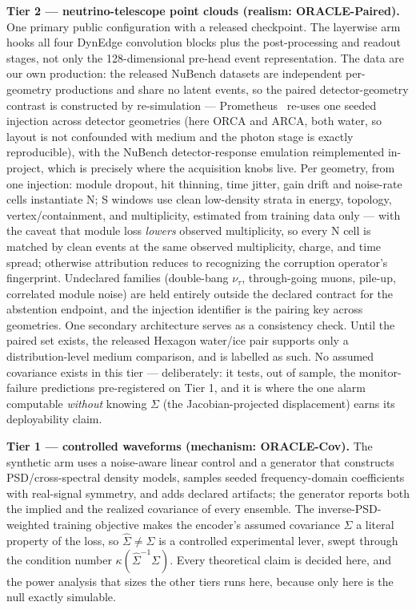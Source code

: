 \documentclass[10pt,twocolumn]{extarticle}
\begin{document}
\textbf{Tier 2 --- neutrino-telescope point clouds (realism:
ORACLE-Paired).} One primary public configuration with a released checkpoint.
The layerwise arm hooks all four DynEdge convolution blocks plus the
post-processing and readout stages, not only the 128-dimensional pre-head
event representation. The data are our own production: the released NuBench
datasets are independent per-geometry productions and share no latent events,
so the paired detector-geometry contrast is constructed by re-simulation ---
Prometheus~\cite{prometheus} re-uses one seeded injection across detector
geometries (here ORCA and ARCA, both water, so layout is not confounded with
medium and the photon stage is exactly reproducible), with the NuBench
detector-response emulation reimplemented in-project, which is precisely where
the acquisition knobs live. Per geometry, from one injection: module dropout,
hit thinning, time jitter, gain drift and noise-rate cells instantiate N; S
windows use clean low-density strata in energy, topology, vertex/containment,
and multiplicity, estimated from training data only --- with the caveat that
module loss \emph{lowers} observed multiplicity, so every N cell is matched
by clean events at the same observed multiplicity, charge, and time spread;
otherwise attribution reduces to recognizing the corruption operator's
fingerprint. Undeclared families (double-bang $\nu_\tau$, through-going
muons, pile-up, correlated module noise) are held entirely outside the
declared contract for the abstention endpoint, and the injection identifier is
the pairing key across geometries. One secondary architecture serves as a
consistency check. Until the paired set exists, the released Hexagon water/ice
pair supports only a distribution-level medium comparison, and is labelled as
such. No assumed covariance exists in this tier --- deliberately: it tests,
out of sample, the monitor-failure predictions pre-registered on Tier 1, and
it is where the one alarm computable \emph{without} knowing $\Sigma$ (the
Jacobian-projected displacement) earns its deployability claim.

\textbf{Tier 1 --- controlled waveforms (mechanism: ORACLE-Cov).} The
synthetic arm uses a noise-aware linear control and a generator that
constructs PSD/cross-spectral density models, samples seeded frequency-domain
coefficients with real-signal symmetry, and adds declared artifacts; the
generator reports both the implied and the realized covariance of every
ensemble. The inverse-PSD-weighted training objective makes the encoder's
assumed covariance $\hat\Sigma$ a literal property of the loss, so
$\hat\Sigma\neq\Sigma$ is a controlled experimental lever, swept through
the condition number $\kappa(\hat\Sigma^{-1}\Sigma)$. Every theoretical
claim is decided here, and the power analysis that sizes the other tiers runs
here, because only here is the null exactly simulable.
\end{document}
